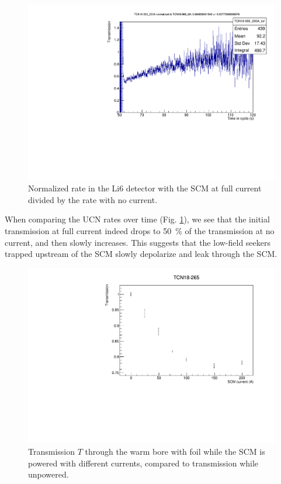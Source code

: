 \documentclass[10pt,letterpaper]{article}
\begin{document}
\begin{figure}
\centering
\includegraphics[width=\textwidth,page=1]{../transmission/TCN18-065_200A_TCN18-065_0A.pdf}
\caption{Normalized rate in the Li6 detector with the SCM at full current divided by the rate with no current.}
\label{fig:SCMtof_nofoil}
\end{figure}

When comparing the UCN rates over time (Fig. \ref{fig:SCMtof_nofoil}), we see that the initial transmission at full current indeed drops to \SI{50}{\percent} of the transmission at no current, and then slowly increases. This suggests that the low-field seekers trapped upstream of the SCM slowly depolarize and leak through the SCM.

\begin{figure}
\centering
\includegraphics[width=\textwidth,page=1]{../transmission/TCN18-265.pdf}
\caption{Transmission $T$ through the warm bore with foil while the SCM is powered with different currents, compared to transmission while unpowered.}
\label{fig:SCMtransmission_foil}
\end{figure}
\end{document}
